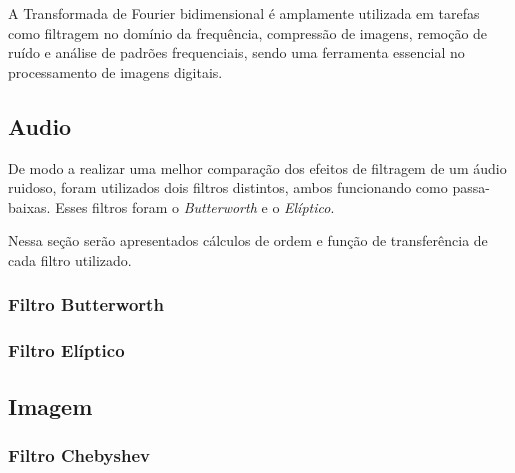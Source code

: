 A Transformada de Fourier bidimensional é amplamente utilizada em tarefas como filtragem no domínio da frequência, compressão de imagens, remoção de ruído e análise de padrões frequenciais, sendo uma ferramenta essencial no processamento de imagens digitais.

\subsection{Audio}
De modo a realizar uma melhor comparação dos efeitos de filtragem de um áudio ruidoso, foram utilizados dois filtros distintos, ambos funcionando como passa-baixas. Esses filtros foram o \textit{Butterworth} e o \textit{Elíptico}.

Nessa seção serão apresentados cálculos de ordem e função de transferência de cada filtro utilizado.

\subsubsection{Filtro Butterworth}


\subsubsection{Filtro Elíptico}


\subsection{Imagem}
\subsubsection{Filtro Chebyshev}

